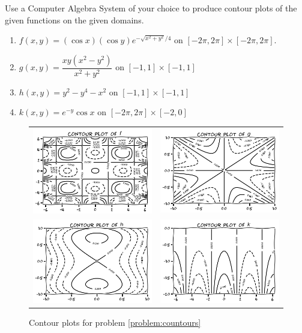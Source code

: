 \begin{problem}[CAS]\label{problem:countours}
Use a Computer Algebra System of your choice to produce contour plots of the given functions on the given domains.
\begin{enumerate}
	\item $f(x,y) = (\cos x)(\cos y) e^{-\sqrt{x^2+y^2}/4}$ on $[-2\pi, 2\pi]\times [-2\pi, 2\pi]$.
	\item $g(x,y) = \dfrac{xy(x^2-y^2)}{x^2+y^2}$ on $[-1,1] \times [-1,1]$
	\item $h(x,y) = y^2 - y^4 -x^2$ on $[-1,1]\times[-1,1]$
	\item $k(x,y) = e^{-y}\cos x$ on $[-2\pi, 2\pi]\times[-2,0]$
\end{enumerate}
\begin{figure}[ht!]
\begin{tabular}{cc}
\includegraphics[width=0.5\linewidth]{images/contourf.png} &
\includegraphics[width=0.5\linewidth]{images/contourg.png} \\
\includegraphics[width=0.5\linewidth]{images/contourh.png} &
\includegraphics[width=0.5\linewidth]{images/contourk.png} 
\end{tabular}
\caption{Contour plots for problem \ref{problem:countours}}
\end{figure}
\end{problem}

